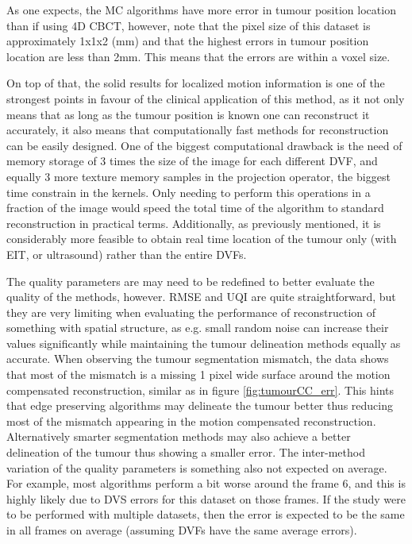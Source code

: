 As one expects, the MC algorithms have more error in tumour position location than if using 4D CBCT, however, note that the pixel size of this dataset is approximately 1x1x2 (mm) and that the highest errors in tumour position location are less than 2mm. This means that the errors are within a voxel size.
 
On top of that, the solid results for localized motion information is one of the strongest points in favour of the clinical application of this method, as it not only means that as long as the tumour position is known one can reconstruct it accurately, it also means that computationally fast methods for reconstruction can be easily designed. One of the biggest computational drawback is the need of memory storage of 3 times the size of the image for each different DVF, and equally 3 more texture memory samples in the projection operator, the biggest time constrain in the kernels. Only needing to perform this operations in a fraction of the image would speed the total time of the algorithm to standard reconstruction in practical terms. Additionally, as previously mentioned, it is considerably more feasible to obtain real time location of the tumour only (with EIT, or ultrasound) rather than the entire DVFs. 

The quality parameters are may need to be redefined to better evaluate the quality of the methods, however. RMSE and UQI are quite straightforward, but they are very limiting when evaluating the performance of reconstruction of something with spatial structure, as e.g. small random noise can increase their values significantly while maintaining the tumour delineation methods equally as accurate. When observing the tumour segmentation mismatch, the data shows that most of the mismatch is a missing 1 pixel wide surface around the motion compensated reconstruction, similar as in figure \ref{fig:tumourCC_err}. This hints that edge preserving algorithms may delineate the tumour better thus reducing most of the mismatch appearing in the motion compensated reconstruction. Alternatively smarter segmentation methods may also achieve a better delineation of the tumour thus showing a smaller error. The inter-method variation of the quality parameters is something also not expected on average. For example, most algorithms perform a bit worse around the frame 6, and this is highly likely due to DVS errors for this dataset on those frames. If the study were to be performed with multiple datasets, then the error is expected to be the same in all frames on average (assuming DVFs have the same average errors). 

